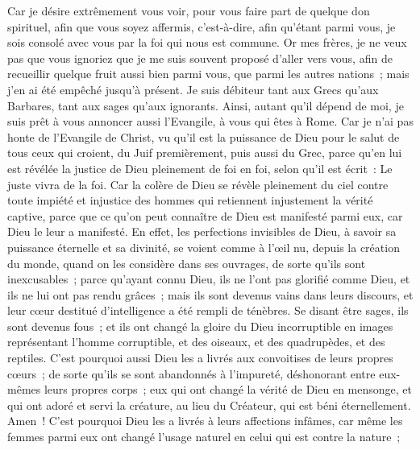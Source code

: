 \begin{multicols}{2}
Car je désire extrêmement vous voir, pour vous faire part de quelque don spirituel, afin que vous soyez affermis,
c'est-à-dire, afin qu'étant parmi vous, je sois consolé avec vous par la foi qui nous est commune.
Or mes frères, je ne veux pas que vous ignoriez que je me suis souvent proposé d'aller vers vous, afin de recueillir quelque fruit aussi bien parmi vous, que parmi les autres nations~; mais j'en ai été empêché jusqu'à présent.
Je suis débiteur tant aux Grecs qu'aux Barbares, tant aux sages qu'aux ignorants.
Ainsi, autant qu'il dépend de moi, je suis prêt à vous annoncer aussi l'Evangile, à vous qui êtes à Rome.
Car je n'ai pas honte de l'Evangile de Christ, vu qu'il est la puissance de Dieu pour le salut de tous ceux qui croient, du Juif premièrement, puis aussi du Grec,
parce qu'en lui est révélée la justice de Dieu pleinement de foi en foi, selon qu'il est écrit~: Le juste vivra de la foi.
Car la colère de Dieu se révèle pleinement du ciel contre toute impiété et injustice des hommes qui retiennent injustement la vérité captive,
parce que ce qu'on peut connaître de Dieu est manifesté parmi eux, car Dieu le leur a manifesté.
En effet, les perfections invisibles de Dieu, à savoir sa puissance éternelle et sa divinité, se voient comme à l'œil nu, depuis la création du monde, quand on les considère dans ses ouvrages, de sorte qu'ils sont inexcusables~;
parce qu'ayant connu Dieu, ils ne l'ont pas glorifié comme Dieu, et ils ne lui ont pas rendu grâces~; mais ils sont devenus vains dans leurs discours, et leur cœur destitué d'intelligence a été rempli de ténèbres.
Se disant être sages, ils sont devenus fous~;
et ils ont changé la gloire du Dieu incorruptible en images représentant l'homme corruptible, et des oiseaux, et des quadrupèdes, et des reptiles.
C'est pourquoi aussi Dieu les a livrés aux convoitises de leurs propres cœurs~; de sorte qu'ils se sont abandonnés à l'impureté, déshonorant entre eux-mêmes leurs propres corps~;
eux qui ont changé la vérité de Dieu en mensonge, et qui ont adoré et servi la créature, au lieu du Créateur, qui est béni éternellement. Amen~!
C'est pourquoi Dieu les a livrés à leurs affections infâmes, car même les femmes parmi eux ont changé l'usage naturel en celui qui est contre la nature~;

\end{multicols}
